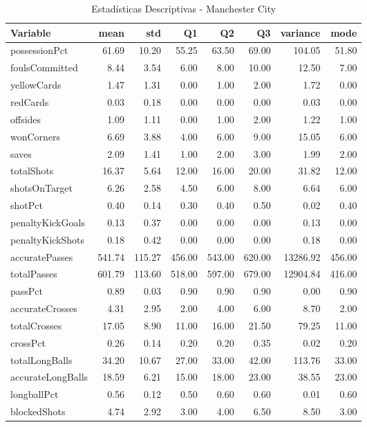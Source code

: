 \begin{table}[H]
\centering
\caption{Estadísticas Descriptivas - Manchester City}
\label{tab:eng_man_city}
\small
\begin{tabular}{lrrrrrrr}
\hline
Variable & mean & std & Q1 & Q2 & Q3 & variance & mode \\
\hline
possessionPct & 61.69 & 10.20 & 55.25 & 63.50 & 69.00 & 104.05 & 51.80 \\
foulsCommitted & 8.44 & 3.54 & 6.00 & 8.00 & 10.00 & 12.50 & 7.00 \\
yellowCards & 1.47 & 1.31 & 0.00 & 1.00 & 2.00 & 1.72 & 0.00 \\
redCards & 0.03 & 0.18 & 0.00 & 0.00 & 0.00 & 0.03 & 0.00 \\
offsides & 1.09 & 1.11 & 0.00 & 1.00 & 2.00 & 1.22 & 1.00 \\
wonCorners & 6.69 & 3.88 & 4.00 & 6.00 & 9.00 & 15.05 & 6.00 \\
saves & 2.09 & 1.41 & 1.00 & 2.00 & 3.00 & 1.99 & 2.00 \\
totalShots & 16.37 & 5.64 & 12.00 & 16.00 & 20.00 & 31.82 & 12.00 \\
shotsOnTarget & 6.26 & 2.58 & 4.50 & 6.00 & 8.00 & 6.64 & 6.00 \\
shotPct & 0.40 & 0.14 & 0.30 & 0.40 & 0.50 & 0.02 & 0.40 \\
penaltyKickGoals & 0.13 & 0.37 & 0.00 & 0.00 & 0.00 & 0.13 & 0.00 \\
penaltyKickShots & 0.18 & 0.42 & 0.00 & 0.00 & 0.00 & 0.18 & 0.00 \\
accuratePasses & 541.74 & 115.27 & 456.00 & 543.00 & 620.00 & 13286.92 & 456.00 \\
totalPasses & 601.79 & 113.60 & 518.00 & 597.00 & 679.00 & 12904.84 & 416.00 \\
passPct & 0.89 & 0.03 & 0.90 & 0.90 & 0.90 & 0.00 & 0.90 \\
accurateCrosses & 4.31 & 2.95 & 2.00 & 4.00 & 6.00 & 8.70 & 2.00 \\
totalCrosses & 17.05 & 8.90 & 11.00 & 16.00 & 21.50 & 79.25 & 11.00 \\
crossPct & 0.26 & 0.14 & 0.20 & 0.20 & 0.35 & 0.02 & 0.20 \\
totalLongBalls & 34.20 & 10.67 & 27.00 & 33.00 & 42.00 & 113.76 & 33.00 \\
accurateLongBalls & 18.59 & 6.21 & 15.00 & 18.00 & 23.00 & 38.55 & 23.00 \\
longballPct & 0.56 & 0.12 & 0.50 & 0.60 & 0.60 & 0.01 & 0.60 \\
blockedShots & 4.74 & 2.92 & 3.00 & 4.00 & 6.50 & 8.50 & 3.00 \\

\end{tabular}
\end{table}

